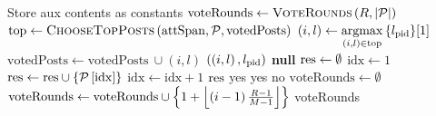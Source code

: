 \begin{algorithm}[H]
  \caption{$\textsc{Vote}\left(\postlist, \mathrm{aux}\right)$}
  \label{alg:steem:vote}
  \begin{algorithmic}[1]
    \State Store aux contents as constants
    \State $\mathrm{voteRounds} \gets \textsc{VoteRounds}\left(\rounds,
    |\postlist|\right)$
      \State $\mathrm{top} \gets \textsc{ChooseTopPosts}\left(\attspan,
      \postlist, \mathrm{votedPosts}\right)$
      \State $\left(i, l\right) \gets \argmax\limits_{\left(i,
      l\right) \in \mathrm{top}}{\lbrace l_{\pid} \rbrace}[1]$
      \State $\mathrm{votedPosts} \gets \mathrm{votedPosts} \: \cup \left(i,
      l\right)$
      \State \Return $\left(\left(i, l\right), l_{\pid}\right)$
    \Else
      \State \Return \textbf{null}
    \EndIf
    \State
      \State $\result \gets \emptyset$
      \State $\mathrm{idx} \gets 1$
          \State $\result \gets \result \cup \lbrace
          \postlist\left[\mathrm{idx}\right] \rbrace$
        \EndIf
        \State $\mathrm{idx} \gets \mathrm{idx} + 1$
      \EndWhile
      \State \Return $\result$
    \EndFunction
    \State
      \If{$\rounds < \postlen$}
        \State \Return yes
        \State \Return yes
      \Else
        \State \Return no
      \EndIf
    \EndFunction
    \State
      \State $\mathrm{voteRounds} \gets \emptyset$
        \State $\mathrm{voteRounds} \gets \mathrm{voteRounds} \cup \left\{1 +
        \floor*{\left(i - 1\right)\frac{\rounds - 1}{\postlen - 1}}\right\}$
      \EndFor
      \State \Return voteRounds
    \EndFunction
  \end{algorithmic}
\end{algorithm}
